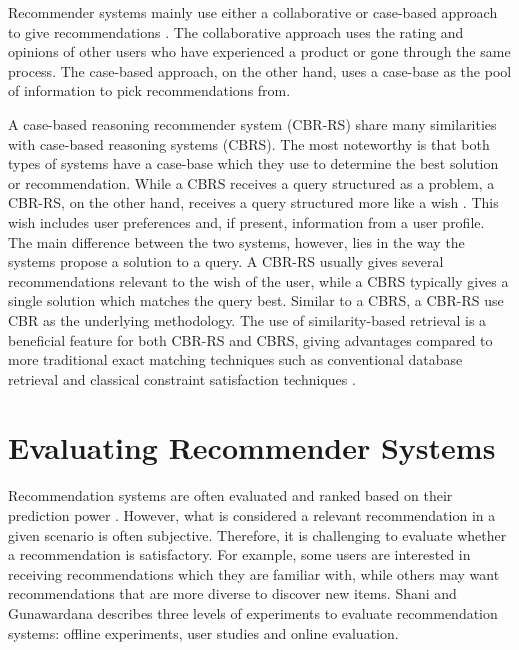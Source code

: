 Recommender systems mainly use either a collaborative or case-based approach to give recommendations \cite{bridge2005case}. The collaborative approach uses the rating and opinions of other users who have experienced a product or gone through the same process. The case-based approach, on the other hand, uses a case-base as the pool of information to pick recommendations from.

A case-based reasoning recommender system (CBR-RS) share many similarities with case-based reasoning systems (CBRS). The most noteworthy is that both types of systems have a case-base which they use to determine the best solution or recommendation. While a CBRS receives a query structured as a problem, a CBR-RS, on the other hand, receives a query structured more like a wish \cite{richter2013case}. This wish includes user preferences and, if present, information from a user profile. The main difference between the two systems, however, lies in the way the systems propose a solution to a query. A CBR-RS usually gives several recommendations relevant to the wish of the user, while a CBRS typically gives a single solution which matches the query best. Similar to a CBRS, a CBR-RS use CBR as the underlying methodology. The use of similarity-based retrieval is a beneficial feature for both CBR-RS and CBRS, giving advantages compared to more traditional exact matching techniques such as conventional database retrieval and classical constraint satisfaction techniques \cite{bridge2005case}.

\section{Evaluating Recommender Systems}

Recommendation systems are often evaluated and ranked based on their prediction power \cite{shani2011evaluating}. However, what is considered a relevant recommendation in a given scenario is often subjective. Therefore, it is challenging to evaluate whether a recommendation is satisfactory. For example, some users are interested in receiving recommendations which they are familiar with, while others may want recommendations that are more diverse to discover new items. Shani and Gunawardana \cite{shani2011evaluating} describes three levels of experiments to evaluate recommendation systems: offline experiments, user studies and online evaluation.

